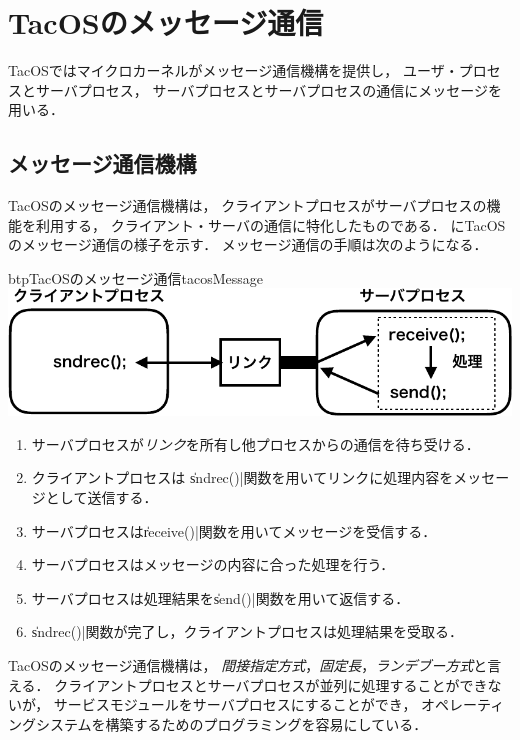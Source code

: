 \chapter{TacOSのメッセージ通信}
\label{tacosIPC}
TacOSではマイクロカーネルがメッセージ通信機構を提供し，
ユーザ・プロセスとサーバプロセス，
サーバプロセスとサーバプロセスの通信にメッセージを用いる．

\section{メッセージ通信機構}
TacOSのメッセージ通信機構は，
クライアントプロセスがサーバプロセスの機能を利用する，
クライアント・サーバの通信に特化したものである．
にTacOSのメッセージ通信の様子を示す．
メッセージ通信の手順は次のようになる．

\begin{myfig}{btp}{TacOSのメッセージ通信}{tacosMessage}
  \includegraphics[scale=0.75]{Fig/tacosMessage-crop.pdf}
\end{myfig}

\begin{enumerate}
\item サーバプロセスが\emph{リンク}を所有し他プロセスからの通信を待ち受ける．
\item クライアントプロセスは
  \|sndrec()|関数を用いてリンクに処理内容をメッセージとして送信する．
  \item サーバプロセスは\|receive()|関数を用いてメッセージを受信する．
  \item サーバプロセスはメッセージの内容に合った処理を行う．
  \item サーバプロセスは処理結果を\|send()|関数を用いて返信する．
  \item \|sndrec()|関数が完了し，クライアントプロセスは処理結果を受取る．
\end{enumerate}

TacOSのメッセージ通信機構は，
\emph{間接指定方式}，\emph{固定長}，\emph{ランデブー方式}と言える．
クライアントプロセスとサーバプロセスが並列に処理することができないが，
サービスモジュールをサーバプロセスにすることができ，
オペレーティングシステムを構築するためのプログラミングを容易にしている．

